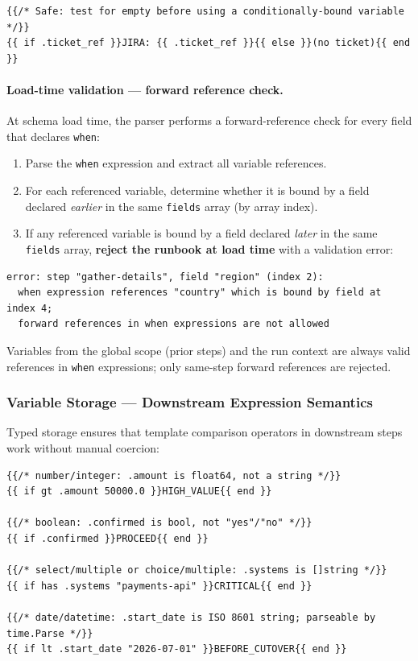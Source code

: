 \begin{verbatim}
{{/* Safe: test for empty before using a conditionally-bound variable */}}
{{ if .ticket_ref }}JIRA: {{ .ticket_ref }}{{ else }}(no ticket){{ end }}
\end{verbatim}

\paragraph{Load-time validation — forward reference check.}
At schema load time, the parser performs a forward-reference check for every field
that declares \texttt{when}:

\begin{enumerate}
  \item Parse the \texttt{when} expression and extract all variable references.
  \item For each referenced variable, determine whether it is bound by a field
        declared \emph{earlier} in the same \texttt{fields} array (by array index).
  \item If any referenced variable is bound by a field declared \emph{later} in the
        same \texttt{fields} array, \textbf{reject the runbook at load time} with a
        validation error:
\end{enumerate}

\begin{verbatim}
error: step "gather-details", field "region" (index 2):
  when expression references "country" which is bound by field at index 4;
  forward references in when expressions are not allowed
\end{verbatim}

\noindent
Variables from the global scope (prior steps) and the run context are always valid
references in \texttt{when} expressions; only same-step forward references are
rejected.

\subsubsection*{Variable Storage — Downstream Expression Semantics}

Typed storage ensures that template comparison operators in downstream steps work without
manual coercion:

\begin{verbatim}
{{/* number/integer: .amount is float64, not a string */}}
{{ if gt .amount 50000.0 }}HIGH_VALUE{{ end }}

{{/* boolean: .confirmed is bool, not "yes"/"no" */}}
{{ if .confirmed }}PROCEED{{ end }}

{{/* select/multiple or choice/multiple: .systems is []string */}}
{{ if has .systems "payments-api" }}CRITICAL{{ end }}

{{/* date/datetime: .start_date is ISO 8601 string; parseable by time.Parse */}}
{{ if lt .start_date "2026-07-01" }}BEFORE_CUTOVER{{ end }}
\end{verbatim}

